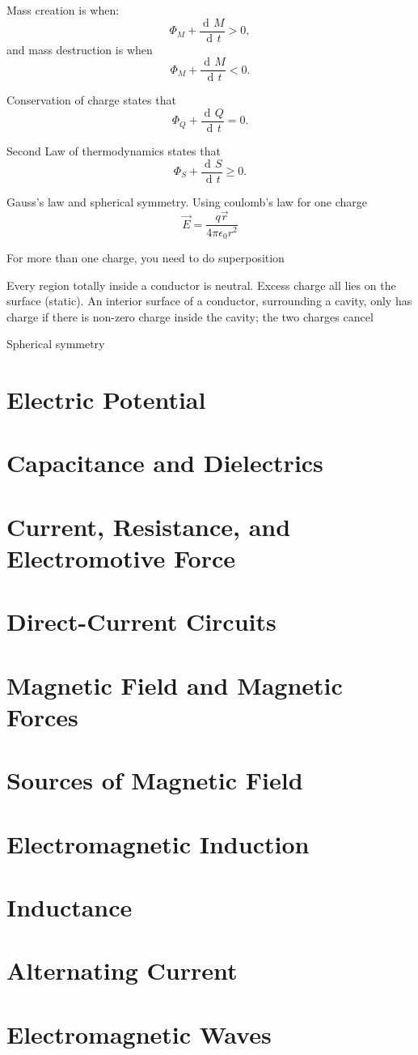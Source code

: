 \documentclass[11pt, letterpaper, titlepage]{report}
\DeclareMathOperator{\di}{d\!} %
\begin{document}
Mass creation is when:
\begin{equation}
\Phi_M + \frac{\di M}{\di t} > 0,
\end{equation}
and mass destruction is when
\begin{equation}
\Phi_M + \frac{\di M}{\di t} < 0.
\end{equation}

Conservation of charge states that
\begin{equation}
\Phi_Q + \frac{\di Q}{\di t} = 0.
\end{equation}

Second Law of thermodynamics states that
\begin{equation}
\Phi_S + \frac{\di S}{\di t} \geq 0.
\end{equation}

Gauss's law and spherical symmetry. Using coulomb's law for one charge
\begin{equation}
\vec{E} = \frac{q \vec{r}}{4 \pi \epsilon_0 r^2}
\end{equation}

For more than one charge, you need to do superposition

Every region totally inside a conductor is neutral. Excess charge all lies on the surface (static). An interior surface of a conductor, surrounding a cavity, only has charge if there is non-zero charge inside the cavity; the two charges cancel

Spherical symmetry 




\chapter{Electric Potential}
\chapter{Capacitance and Dielectrics}
\chapter{Current, Resistance, and Electromotive Force}
\chapter{Direct-Current Circuits}
\chapter{Magnetic Field and Magnetic Forces}
\chapter{Sources of Magnetic Field}
\chapter{Electromagnetic Induction}
\chapter{Inductance}
\chapter{Alternating Current}
\chapter{Electromagnetic Waves}
\end{document}
